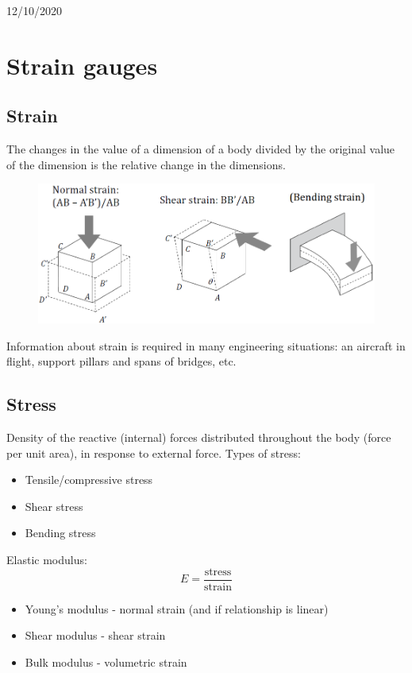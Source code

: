 \documentclass[class=report, crop=false, 12pt,a4paper]{standalone}
\begin{document}
\begin{center}
  12/10/2020
\end{center}
\section{Strain gauges}
\subsection{Strain}
The changes in the value of a dimension of a body divided by the original value of the dimension is the relative change in the dimensions. 
\begin{figure}[H]
  \centering
  \includegraphics[width = 0.8 \textwidth]{../img/diagram8.png}
\end{figure}
Information about strain is required in many engineering situations: an aircraft in flight, support pillars and spans of bridges, etc.
\subsection{Stress}
Density of the reactive (internal) forces distributed throughout the body (force per unit area), in response to external force. Types of stress:
\begin{itemize}
  \item Tensile/compressive stress
  \item Shear stress
  \item Bending stress
\end{itemize}
Elastic modulus:
\begin{equation}
  E = \frac{\textrm{stress}}{\textrm{strain}}
\end{equation}
\begin{itemize}
  \item Young's modulus - normal strain (and if relationship is linear)
  \item Shear modulus - shear strain
  \item Bulk modulus - volumetric strain
\end{itemize}
\end{document}
